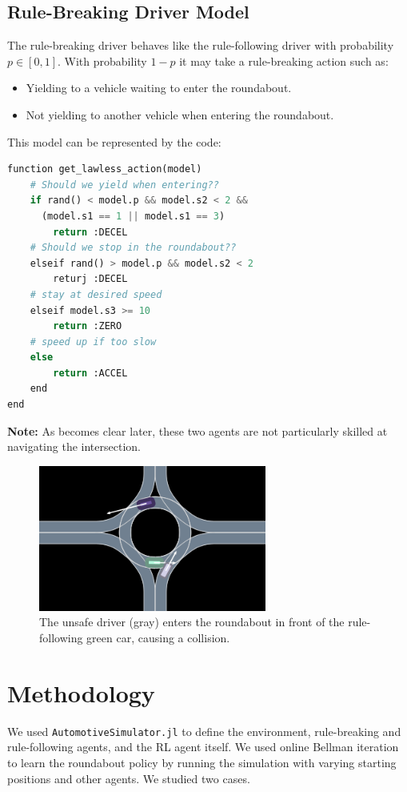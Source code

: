 \documentclass[conference]{IEEEtran}
\begin{document}
\subsection*{Rule-Breaking Driver Model}
The rule-breaking driver behaves like the rule-following driver with probability $p \in [0,1]$. With probability $1-p$ it may take a rule-breaking action such as:
\begin{itemize}
	\item Yielding to a vehicle waiting to enter the roundabout.
	\item Not yielding to another vehicle when entering the roundabout.
\end{itemize}
This model can be represented by the code:
\begin{lstlisting}[language=python,caption={Rule-breaking driver model.}]
function get_lawless_action(model)
    # Should we yield when entering??
    if rand() < model.p && model.s2 < 2 &&
      (model.s1 == 1 || model.s1 == 3)
        return :DECEL
    # Should we stop in the roundabout??
    elseif rand() > model.p && model.s2 < 2
        returj :DECEL
    # stay at desired speed
    elseif model.s3 >= 10
        return :ZERO
    # speed up if too slow
    else
        return :ACCEL
    end
end
\end{lstlisting}

\textbf{Note:} As becomes clear later, these two agents are not particularly skilled at navigating the intersection.
\begin{figure}[h!]
	\centering
\includegraphics[width=0.7\linewidth]{figures/unsafe.png}
\caption{The unsafe driver (gray) enters the roundabout in front of the rule-following green car, causing a collision.}
\label{fig:unsafe}
\end{figure}

\section{Methodology}
We used \verb|AutomotiveSimulator.jl| \cite{simulator.jl} to define the environment, rule-breaking and rule-following agents, and the RL agent itself.
We used online Bellman iteration \cite{kochenderfer2022algorithmsch7} to learn the roundabout policy by running the simulation with varying starting positions and other agents.
We studied two cases.
\end{document}
